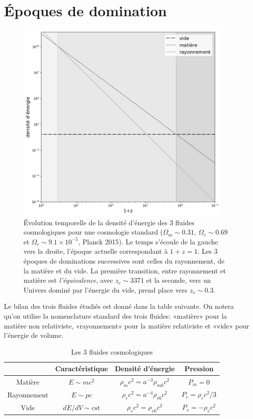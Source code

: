 \section{Époques de domination}
\begin{figure}[htbp]
	\centering
		\includegraphics[height=10cm]{figs/era.png}
	\caption[Époques de domination des fluides cosmiques]{Évolution temporelle de la densité d'énergie des 3 fluides cosmologiques pour une cosmologie standard ($\Omega_m \sim 0.31$, $\Omega_v \sim 0.69$ et $\Omega_r\sim 9.1\times 10^{-5}$, Planck 2015). Le temps s'écoule de la gauche vers la droite, l'époque actuelle correspondant à $1+z=1$. Les 3 époques de dominations successives sont celles du rayonnement, de la matière et du vide. La première transition, entre rayonnement et matière est \textit{ l'équivalence}, avec $z_e\sim 3371$ et la seconde, vers un Univers dominé par l'énergie du vide, prend place vers $z_v \sim 0.3$. }
	\label{f:era}
\end{figure}
Le bilan des trois fluides étudiés est donné dans la table suivante. On notera qu'on utilise la nomenclature standard des trois fluides: «matière» pour la matière non relativiste, «rayonnement» pour la matière relativiste et «vide» pour l'énergie de volume.
\begin{table}[h]
\begin{center}
\begin{tabular}{|c|c|c|c|}
\hline 
 & Caractéristique & Densité d'énergie & Pression \\ 
\hline 
Matière & $E\sim mc^2$ & $\rho_mc^2 =a^{-3}\rho_{m0}c^2$& $P_m=0$\\ 
\hline 
Rayonnement & $E\sim pc$ & $\rho_rc^2 =a^{-4}\rho_{r0}c^2$ & $P_r=\rho_rc^2/3$ \\ 
\hline 
Vide & $dE/dV\sim \mathrm{cst}$ & $\rho_vc^2 =\rho_{v0}c^2$ & $P_v=-\rho_vc^2$ \\ 
\hline 
\end{tabular} 
\end{center}
\caption{Les 3 fluides cosmologiques}
\end{table}

